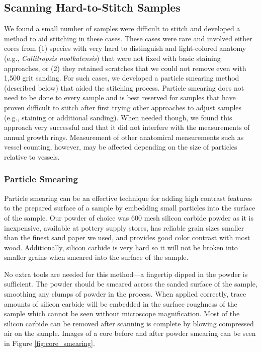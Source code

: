 \documentclass[a4paper,12pt]{article}
\newcommand{\R}[1]{\label{#1}\linelabel{#1}}
\begin{document}
\subsection{Scanning Hard-to-Stitch Samples} 

\R{particle_smearing_1}
We found a small number of samples were difficult to stitch and developed a method to aid stitching in these cases. These cases were rare and involved either cores from (1) species with very hard to distinguish and light-colored anatomy (e.g., \emph{Callitropsis nootkatensis}) that were not fixed with basic staining approaches, or (2) they retained scratches that we could not remove even with 1,500 grit sanding. For such cases, we developed a particle smearing method (described below) that aided the stitching process. Particle smearing does not need to be done to every sample and is best reserved for samples that have proven difficult to stitch after first trying other approaches to adjust samples (e.g., staining or additional sanding). When needed though, we found this approach very successful and that it did not interfere with the measurements of annual growth rings. Measurement of other anatomical measurements such as vessel counting, however, may be affected depending on the size of particles relative to vessels. 
\R{particle_smearing_2}

\subsubsection{Particle Smearing}

Particle smearing can be an effective technique for adding high contrast features to the prepared surface of a sample by embedding small particles into the surface of the sample. 
Our powder of choice was 600 mesh silicon carbide powder as it is inexpensive, available at pottery supply stores, has reliable grain sizes smaller than the finest sand paper we used, and provides good color contrast with most wood. 
Additionally, silicon carbide is very hard so it will not be broken into smaller grains when smeared into the surface of the sample. 

No extra tools are needed for this method---a fingertip dipped in the powder is sufficient. The powder should be smeared across the sanded surface of the sample, smoothing any clumps of powder in the process. 
When applied correctly, trace amounts of silicon carbide will be embedded in the surface roughness of the sample which cannot be seen without microscope magnification. Most of the silicon carbide can be removed after scanning is complete by blowing compressed air on the sample. Images of a core before and after powder smearing can be seen in Figure \ref{fig:core_smearing}. %
\end{document}

